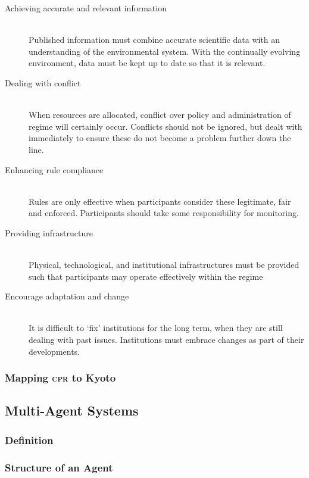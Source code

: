 \documentclass[]{article} %
\begin{document}
\begin{description}
	\item[Achieving accurate and relevant information] \hfill \\
	Published information must combine accurate scientific data with an understanding of the environmental system. With the continually evolving environment, data must be kept up to date so that it is relevant. 
	
	\item[Dealing with conflict] \hfill \\
	When resources are allocated, conflict over policy and administration of regime will certainly occur. Conflicts should not be ignored, but dealt with immediately to ensure these do not become a problem further down the line. 

	\item[Enhancing rule compliance] \hfill \\
	Rules are only effective when participants consider these legitimate, fair and enforced. Participants should take some responsibility for monitoring.
	
	\item[Providing infrastructure] \hfill \\
	Physical, technological, and institutional infrastructures must be provided such that participants may operate effectively within the regime
	
	\item[Encourage adaptation and change] \hfill \\
	It is difficult to ‘fix’ institutions for the long term, when they are still dealing with past issues. Institutions must embrace changes as part of their developments.
\end{description}

\subsubsection{Mapping \textsc{cpr} to Kyoto}

\subsection{Multi-Agent Systems}

\subsubsection{Definition}

\subsubsection{Structure of an Agent}
\end{document}
